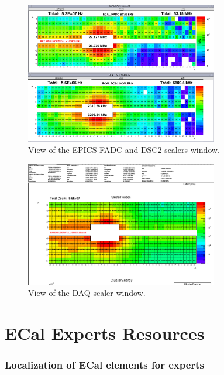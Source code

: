 \documentclass[12pt]{article}
\begin{document}
\begin{figure}[hbp]
\center
\includegraphics[width=0.75\textwidth]{pics/ECAL_FADC_SCALER_2014_12_20.png}
\caption{\small \label{Scalers} View of the EPICS FADC and DSC2 scalers window.}
\end{figure}

\begin{figure}[hbp]
\center
\includegraphics[width=0.75\textwidth]{pics/ecal-cluster-12-20-14.png}
\caption{\small \label{DAQscalers} View of the DAQ scaler window.}
\end{figure}

\newpage

\part{ECal Experts Resources}

   \section{Localization of ECal elements for experts}
\end{document}
